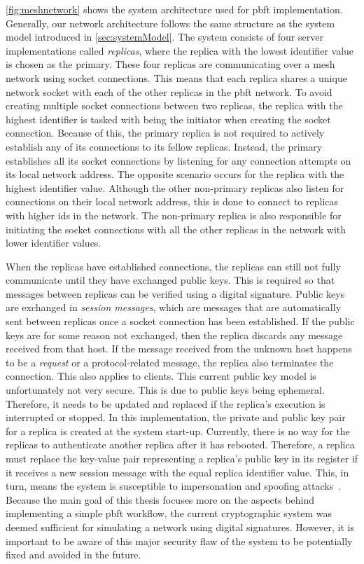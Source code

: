 \autoref{fig:meshnetwork} shows the system architecture used for \ac{pbft} implementation. Generally, our network architecture follows the same structure as the system model introduced in \autoref{sec:systemModel}. The system consists of four server implementations called \emph{replicas}, where the replica with the lowest identifier value is chosen as the primary. These four replicas are communicating over a mesh network using socket connections. This means that each replica shares a unique network socket with each of the other replicas in the \ac{pbft} network. To avoid creating multiple socket connections between two replicas, the replica with the highest identifier is tasked with being the initiator when creating the socket connection. Because of this, the primary replica is not required to actively establish any of its connections to its fellow replicas. Instead, the primary establishes all its socket connections by listening for any connection attempts on its local network address. The opposite scenario occurs for the replica with the highest identifier value. Although the other non-primary replicas also listen for connections on their local network address, this is done to connect to replicas with higher ids in the network. The non-primary replica is also responsible for initiating the socket connections with all the other replicas in the network with lower identifier values.

When the replicas have established connections, the replicas can still not fully communicate until they have exchanged public keys. This is required so that messages between replicas can be verified using a digital signature. Public keys are exchanged in \emph{session messages}, which are messages that are automatically sent between replicas once a socket connection has been established. If the public keys are for some reason not exchanged, then the replica discards any message received from that host. If the message received from the unknown host happens to be a \emph{request} or a protocol-related message, the replica also terminates the connection. This also applies to clients. This current public key model is unfortunately not very secure. This is due to public keys being ephemeral. Therefore, it needs to be updated and replaced if the replica’s execution is interrupted or stopped.
In this implementation, the private and public key pair for a replica is created at the system start-up. Currently, there is no way for the replicas to authenticate another replica after it has rebooted. Therefore, a replica must replace the key-value pair representing a replica’s public key in its register if it receives a new session message with the equal replica identifier value. This, in turn, means the system is susceptible to impersonation and spoofing attacks~\cite{WEB:spoofingAttack}. Because the main goal of this thesis focuses more on the aspects behind implementing a simple \ac{pbft} workflow, the current cryptographic system was deemed sufficient for simulating a network using digital signatures. However, it is important to be aware of this major security flaw of the system to be potentially fixed and avoided in the future.

